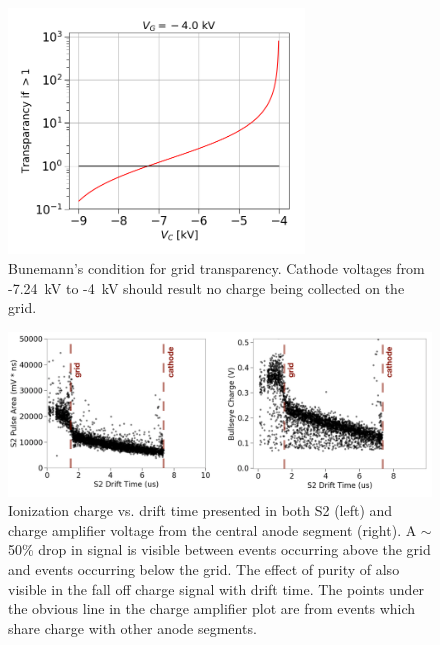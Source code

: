 \begin{figure}[htbp]
\begin{center}
\includegraphics[width=0.7\textwidth]{figures/etrains/bune.png}
\caption{Bunemann's condition for grid transparency. Cathode voltages from -7.24~kV to -4~kV should result no charge being collected on the grid.}
\label{fig:bune}
\end{center}
\end{figure}

\begin{figure}[htbp]
\begin{center}
\includegraphics[width=\textwidth]{figures/etrains/s2_charge_vs_drift.png}
\caption{Ionization charge vs. drift time presented in both S2 (left) and charge amplifier voltage from the central anode segment (right). A $\sim$50\% drop in signal is visible between events occurring above the grid and events occurring below the grid. The effect of purity of also visible in the fall off charge signal with drift time. The points under the obvious line in the charge amplifier plot are from events which share charge with other anode segments.}
\label{fig:charge_vs_drift}
\end{center}
\end{figure}


